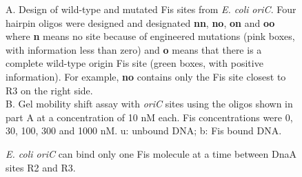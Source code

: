 \documentclass[doublespacing]{narfront}
\begin{document}
\begin{figure}[ht] %
\caption{\emph{E. coli oriC} can bind only one Fis molecule
at a time between DnaA sites R2 and R3.}
A. Design of wild-type and mutated Fis sites from
\emph{E. coli} \emph{oriC}.
Four hairpin oligos were designed and designated
\textbf{nn},
\textbf{no},
\textbf{on}
and
\textbf{oo}
where \textbf{n} means no site
because of engineered mutations
(pink boxes, with information less than zero)
and \textbf{o} means that there is
a complete wild-type origin Fis site
(green boxes, with positive information).
For example,
\textbf{no} contains only the Fis site closest to R3 on the right side.
\\
B.  Gel mobility shift assay with \emph{oriC} sites using the oligos
shown in part A at a concentration of 10 nM each.
Fis concentrations were 0, 30, 100, 300 and 1000 nM.
u: unbound DNA;
b: Fis bound DNA.
\label{fig.oriCexperiment}
\end{figure} %
\end{document}
